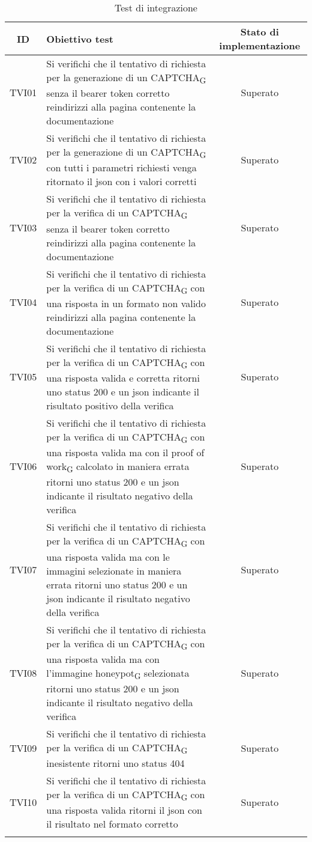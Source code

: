\begin{center}
	\setlength\extrarowheight{5pt}
	\begin{xltabular}{\textwidth}{|c|X|c|}
		\hline
		\textbf{ID} & \textbf{Obiettivo test} & \textbf{Stato di implementazione} \\
		\hline
		TVI01 & Si verifichi che il tentativo di richiesta per la generazione di un CAPTCHA\textsubscript{G} senza il bearer token corretto reindirizzi alla pagina contenente la documentazione & Superato\\
		\hline
		TVI02 & Si verifichi che il tentativo di richiesta per la generazione di un CAPTCHA\textsubscript{G} con tutti i parametri richiesti venga ritornato il json con i valori corretti & Superato\\
		\hline
		TVI03 & Si verifichi che il tentativo di richiesta per la verifica di un CAPTCHA\textsubscript{G} senza il bearer token corretto reindirizzi alla pagina contenente la documentazione & Superato\\
		\hline
		TVI04 & Si verifichi che il tentativo di richiesta per la verifica di un CAPTCHA\textsubscript{G} con una risposta in un formato non valido reindirizzi alla pagina contenente la documentazione & Superato\\
		\hline
		TVI05 & Si verifichi che il tentativo di richiesta per la verifica di un CAPTCHA\textsubscript{G} con una risposta valida e corretta ritorni uno status 200 e un json indicante il risultato positivo della verifica & Superato\\
		\hline
		TVI06 & Si verifichi che il tentativo di richiesta per la verifica di un CAPTCHA\textsubscript{G} con una risposta valida ma con il proof of work\textsubscript{G} calcolato in maniera errata ritorni uno status 200 e un json indicante il risultato negativo della verifica & Superato\\
		\hline
		TVI07 & Si verifichi che il tentativo di richiesta per la verifica di un CAPTCHA\textsubscript{G} con una risposta valida ma con le immagini selezionate in maniera errata ritorni uno status 200 e un json indicante il risultato negativo della verifica & Superato\\
		\hline
		TVI08 & Si verifichi che il tentativo di richiesta per la verifica di un CAPTCHA\textsubscript{G} con una risposta valida ma con l'immagine honeypot\textsubscript{G} selezionata ritorni uno status 200 e un json indicante il risultato negativo della verifica & Superato\\
		\hline
		TVI09 & Si verifichi che il tentativo di richiesta per la verifica di un CAPTCHA\textsubscript{G} inesistente ritorni uno status 404 & Superato\\
		\hline
		TVI10 & Si verifichi che il tentativo di richiesta per la verifica di un CAPTCHA\textsubscript{G} con una risposta valida ritorni il json con il risultato nel formato corretto & Superato\\
		\hline
		\caption{Test di integrazione}
	\end{xltabular}
\end{center}

